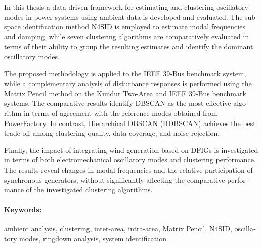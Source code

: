 \begin{english}
\textenglish{In this thesis a data-driven framework for estimating and clustering oscillatory modes in power systems using ambient data is developed and evaluated. The subspace identification method N4SID is employed to estimate modal frequencies and damping, while seven clustering algorithms are comparatively evaluated in terms of their ability to group the resulting estimates and identify the dominant oscillatory modes.}

\textenglish{The proposed methodology is applied to the IEEE 39-Bus benchmark system, while a complementary analysis of disturbance responses is performed using the Matrix Pencil method on the Kundur Two-Area and IEEE 39-Bus benchmark systems. The comparative results identify DBSCAN as the most effective algorithm in terms of agreement with the reference modes obtained from PowerFactory. In contrast, Hierarchical DBSCAN (HDBSCAN) achieves the best trade-off among clustering quality, data coverage, and noise rejection.}

\textenglish{Finally, the impact of integrating wind generation based on DFIGs is investigated in terms of both electromechanical oscillatory modes and clustering performance. The results reveal changes in modal frequencies and the relative participation of synchronous generators, without significantly affecting the comparative performance of the investigated clustering algorithms.
}

\paragraph{\textenglish{Keywords:}} \textenglish{ambient analysis, clustering, inter-area, intra-area, Matrix Pencil, N4SID, oscillatory modes, ringdown analysis, system identification}
\end{english}
